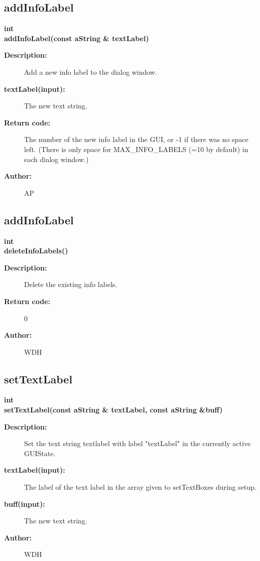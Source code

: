 \subsection{addInfoLabel}
 
\begin{flushleft} \textbf{%
int  \\ 
\settowidth{\DialogDataIncludeArgIndent}{addInfoLabel(}%
addInfoLabel(const aString \& textLabel)
}\end{flushleft}
\begin{description}
\item[{\bf Description:}]  Add a new info label to the dialog window.

\item[{\bf textLabel(input):}]  The new text string.

\item[{\bf Return code:}]  The number of the new info label in the GUI, or -1 if there was no
 space left. (There is only space for MAX\_INFO\_LABELS (=10 by default) in each dialog window.)
\item[{\bf Author:}]  AP
\end{description}
\subsection{addInfoLabel}
 
\begin{flushleft} \textbf{%
int  \\ 
\settowidth{\DialogDataIncludeArgIndent}{deleteInfoLabels(}%
deleteInfoLabels()
}\end{flushleft}
\begin{description}
\item[{\bf Description:}]  Delete the existing info labels.

\item[{\bf Return code:}]  0 
\item[{\bf Author:}]  WDH
\end{description}
\subsection{setTextLabel}
 
\begin{flushleft} \textbf{%
int  \\ 
\settowidth{\DialogDataIncludeArgIndent}{setTextLabel(}%
setTextLabel(const aString \& textLabel, const aString \&buff)
}\end{flushleft}
\begin{description}
\item[{\bf Description:}]  Set the text string textlabel with label "textLabel" in the currently
 active GUIState.

\item[{\bf textLabel(input):}]  The label of the text label in the array given to setTextBoxes during setup.
\item[{\bf buff(input):}]  The new text string.

\item[{\bf Author:}]  WDH
\end{description}
